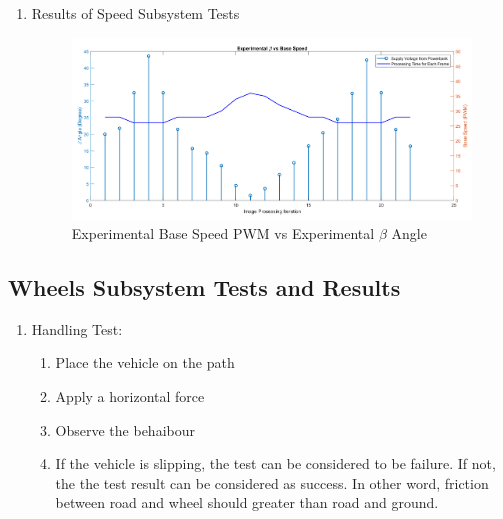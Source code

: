 \documentclass[a4paper,12pt]{article}
\begin{document}
\begin{enumerate}
\item{Results of Speed Subsystem Tests}



	\begin{figure}[h]
		\includegraphics[width=\textwidth,center]{images/ROT_ROI/baseSpeedExp_crop}
		\caption{Experimental Base Speed PWM vs Experimental $\beta$ Angle}\label{fig:baseSpeedExp}
	\end{figure}


\end{enumerate}





\subsection{Wheels Subsystem Tests and Results} 


\begin{enumerate}

\item {Handling Test:} 

\begin{enumerate}

\item  Place the vehicle on the path

\item Apply a horizontal force

\item Observe the behaibour 

\item If the vehicle is slipping, the test can be considered to be failure. If not, the the test result can be considered as success. In other word, friction between road and wheel should greater than road and ground. 


\end{enumerate}

\end{enumerate}
\end{document}
